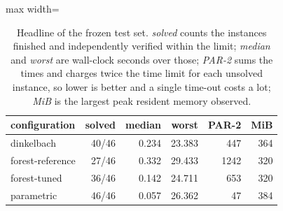 \begin{table}[tbp]
\centering
\caption{Headline of the frozen test set. \emph{solved} counts the instances finished and independently verified within the limit; \emph{median} and \emph{worst} are wall-clock seconds over those; \emph{PAR-2} sums the times and charges twice the time limit for each unsolved instance, so lower is better and a single time-out costs a lot; \emph{MiB} is the largest peak resident memory observed.}
\label{tab:summary}
\small
\begin{adjustbox}{max width=\textwidth}
\begin{tabular}{lrrrrr}
\toprule
configuration & solved & median & worst & PAR-2 & MiB \\
\midrule
dinkelbach & 40/46 & 0.234 & 23.383 & 447 & 364 \\
forest-reference & 27/46 & 0.332 & 29.433 & 1242 & 320 \\
forest-tuned & 36/46 & 0.142 & 24.711 & 653 & 320 \\
parametric & 46/46 & 0.057 & 26.362 & 47 & 384 \\
\bottomrule
\end{tabular}
\end{adjustbox}
\end{table}
